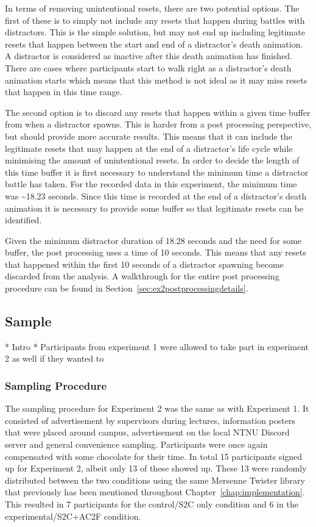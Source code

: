 In terms of removing unintentional resets, there are two potential options. The first of these is to simply not include any resets that happen during battles with distractors. This is the simple solution, but may not end up including legitimate resets that happen between the start and end of a distractor's death animation. A distractor is considered as inactive after this death animation has finished. There are cases where participants start to walk right as a distractor's death animation starts which means that this method is not ideal as it may miss resets that happen in this time range. 

The second option is to discard any resets that happen within a given time buffer from when a distractor spawns. This is harder from a post processing perspective, but should provide more accurate results. This means that it can include the legitimate resets that may happen at the end of a distractor's life cycle while minimising the amount of unintentional resets. 
In order to decide the length of this time buffer it is first necessary to understand the minimum time a distractor battle has taken. For the recorded data in this experiment, the minimum time was \textasciitilde18.23 seconds. Since this time is recorded at the end of a distractor's death animation it is necessary to provide some buffer so that legitimate resets can be identified.

Given the minimum distractor duration of 18.28 seconds and the need for some buffer, the post processing uses a time of 10 seconds. This means that any resets that happened within the first 10 seconds of a distractor spawning become discarded from the analysis. A walkthrough for the entire post processing procedure can be found in Section~\ref{sec:ex2postprocessingdetails}.

\subsection{Sample}
* Intro
* Participants from experiment 1 were allowed to take part in experiment 2 as well if they wanted to

\subsubsection{Sampling Procedure}

The sampling procedure for Experiment 2 was the same as with Experiment 1. It consisted of advertisement by supervisors during lectures, information posters that were  placed around campus, advertisement on the local NTNU Discord server and general convenience sampling. Participants were once again compensated with some chocolate for their time. In total 15 participants signed up for Experiment 2, albeit only 13 of these showed up. These 13 were randomly distributed between the two conditions using the same Mersenne Twister library~\cite{MersenneTwisterLibraryLink} that previously has been mentioned throughout Chapter~\ref{chap:implementation}. This resulted in 7 participants for the control/S2C only condition and 6 in the experimental/S2C+AC2F condition. 

